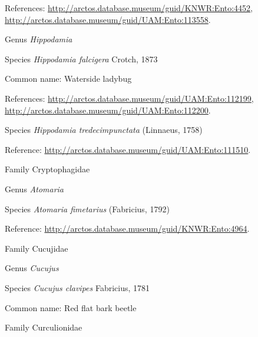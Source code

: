 \documentclass[9pt, article]{memoir}
\begin{document}
\begin{multicols}{2}
References: 
\url{http://arctos.database.museum/guid/KNWR:Ento:4452}, 
\url{http://arctos.database.museum/guid/UAM:Ento:113558}.

\vspace{6pt}\noindent\hspace{30pt}Genus \textit{Hippodamia}


\vspace{6pt}\noindent\hspace{36pt}Species \textit{Hippodamia falcigera} Crotch, 1873


Common name: Waterside ladybug

References: 
\url{http://arctos.database.museum/guid/UAM:Ento:112199}, 
\url{http://arctos.database.museum/guid/UAM:Ento:112200}.

\vspace{6pt}\noindent\hspace{36pt}Species \textit{Hippodamia tredecimpunctata} (Linnaeus, 1758)


Reference: 
\url{http://arctos.database.museum/guid/UAM:Ento:111510}.

\vspace{6pt}\noindent\hspace{24pt}Family Cryptophagidae


\vspace{6pt}\noindent\hspace{30pt}Genus \textit{Atomaria}


\vspace{6pt}\noindent\hspace{36pt}Species \textit{Atomaria fimetarius} (Fabricius, 1792)


Reference: 
\url{http://arctos.database.museum/guid/KNWR:Ento:4964}.

\vspace{6pt}\noindent\hspace{24pt}Family Cucujidae


\vspace{6pt}\noindent\hspace{30pt}Genus \textit{Cucujus}


\vspace{6pt}\noindent\hspace{36pt}Species \textit{Cucujus clavipes} Fabricius, 1781


Common name: Red flat bark beetle

\vspace{6pt}\noindent\hspace{24pt}Family Curculionidae



\end{multicols}
\end{document}

